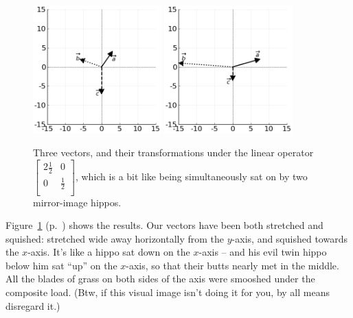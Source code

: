\begin{figure}[ht]
\centering
\includegraphics[width=0.44\textwidth]{preoperators.png}
\includegraphics[width=0.44\textwidth]{stretchSquishOp.png}
\caption[.]{Three vectors, and their transformations under the linear operator 
{\scriptsize $\begin{bmatrix} 2\frac{1}{2} & 0 \\ 0 & \frac{1}{2} \\
\end{bmatrix}$,} which is a bit like being simultaneously sat on by two
mirror-image hippos.}
\label{fig:stretchSquishOp}
\end{figure}


Figure~\ref{fig:stretchSquishOp} (p.~\pageref{fig:stretchSquishOp}) shows the
results. Our vectors have been both stretched and squished: stretched wide away
horizontally from the $y$-axis, and squished towards the $x$-axis. It's like a
hippo sat down on the $x$-axis -- and his evil twin hippo below him sat ``up''
on the $x$-axis, so that their butts nearly met in the middle. All the blades
of grass on both sides of the axis were smooshed under the composite load.
(Btw, if this visual image isn't doing it for you, by all means disregard it.)

\bigskip

